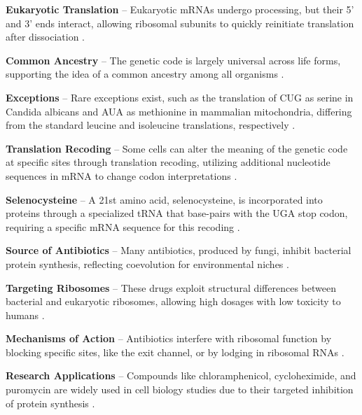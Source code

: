 \textbf{Eukaryotic Translation} – Eukaryotic mRNAs undergo processing, but their 5' and 3' ends interact, allowing ribosomal subunits to quickly reinitiate translation after dissociation \cite*{L1-Chapter6}.



\textbf{Common Ancestry} – The genetic code is largely universal across life forms, supporting the idea of a common ancestry among all organisms \cite*{L1-Chapter6}.

\textbf{Exceptions} – Rare exceptions exist, such as the translation of CUG as serine in Candida albicans and AUA as methionine in mammalian mitochondria, differing from the standard leucine and isoleucine translations, respectively \cite*{L1-Chapter6}.

\textbf{Translation Recoding} – Some cells can alter the meaning of the genetic code at specific sites through translation recoding, utilizing additional nucleotide sequences in mRNA to change codon interpretations \cite*{L1-Chapter6}.

\textbf{Selenocysteine} – A 21st amino acid, selenocysteine, is incorporated into proteins through a specialized tRNA that base-pairs with the UGA stop codon, requiring a specific mRNA sequence for this recoding \cite*{L1-Chapter6}.



\textbf{Source of Antibiotics} – Many antibiotics, produced by fungi, inhibit bacterial protein synthesis, reflecting coevolution for environmental niches \cite*{L1-Chapter6}.

\textbf{Targeting Ribosomes} – These drugs exploit structural differences between bacterial and eukaryotic ribosomes, allowing high dosages with low toxicity to humans \cite*{L1-Chapter6}.

\textbf{Mechanisms of Action} – Antibiotics interfere with ribosomal function by blocking specific sites, like the exit channel, or by lodging in ribosomal RNAs \cite*{L1-Chapter6}.

\textbf{Research Applications} – Compounds like chloramphenicol, cycloheximide, and puromycin are widely used in cell biology studies due to their targeted inhibition of protein synthesis \cite*{L1-Chapter6}.




